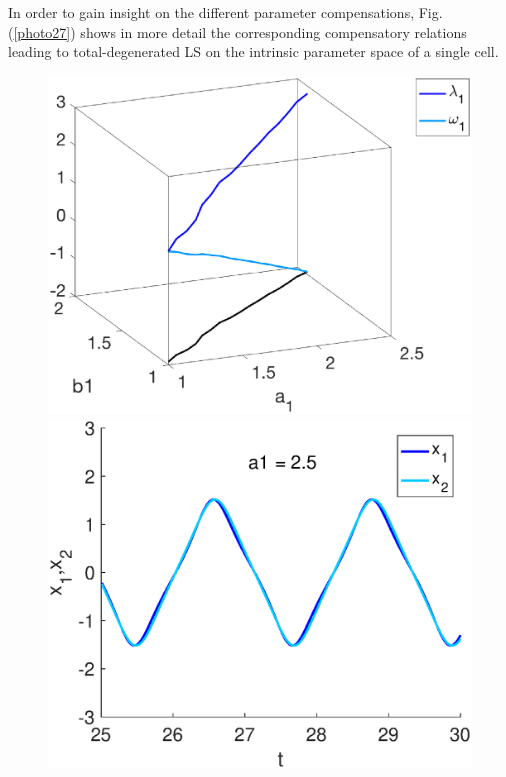 In order to gain insight on the different parameter compensations, Fig. (\ref{photo27}) shows in more detail the corresponding compensatory relations leading to total-degenerated LS on the intrinsic parameter space of a single cell.

\begin{figure}[h]
  \begin{minipage}{0.32\linewidth}
  \begin{center}
\includegraphics[width=1\linewidth]{Images/photo27_1.eps}
\end{center}
  \end{minipage} 
  \begin{minipage}{0.32\linewidth}
  \begin{center}
\includegraphics[width=1\linewidth]{Images/photo27_2.eps}
\end{center}


\end{minipage}
\end{figure}
